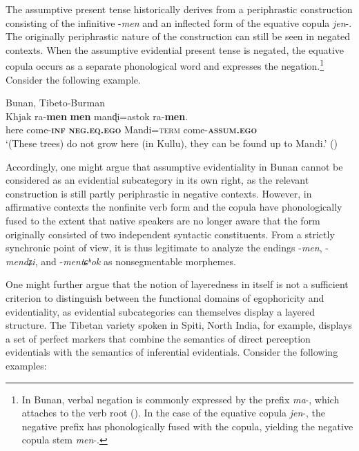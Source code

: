 \documentclass[output=paper]{langsci/langscibook}
\begin{document}
The assumptive present tense historically derives from a periphrastic construction consisting of the infinitive -\textit{men} and an inflected form of the equative copula \textit{jen}-. The originally periphrastic nature of the construction can still be seen in negated contexts. When the assumptive evidential present tense is negated, the equative copula occurs as a separate phonological word and expresses the negation.\footnote{In Bunan, verbal negation is commonly expressed by the prefix \textit{ma}-, which attaches to the verb root (\citealt[429--432]{Widmer2017a}). In the case of the equative copula \textit{jen}-, the negative prefix has phonologically fused with the copula, yielding the negative copula stem \textit{men}-.} Consider the following example.

\begin{exe}
	\ex Bunan, Tibeto-Burman\label{ex:mw5}\\
	\gll Khjak ra-\textbf{men} \textbf{men} manɖi=astok ra-\textbf{men}.\\
	here	 come-\textbf{\textsc{inf}} \textbf{\textsc{neg}.\textsc{eq}.\textsc{ego}} Mandi=\textsc{term} come-\textbf{\textsc{assum}.\textsc{ego}}\\
	\trans ‘(These trees) do not grow here (in Kullu), they can be found up to Mandi.’ (\citealt[223]{Widmer2017a})
\end{exe}


Accordingly, one might argue that assumptive evidentiality in Bunan cannot be considered as an evidential subcategory in its own right, as the relevant construction is still partly periphrastic in negative contexts. However, in affirmative contexts the nonfinite verb form and the copula have phonologically fused to the extent that native speakers are no longer aware that the form originally consisted of two independent syntactic constituents. From a strictly synchronic point of view, it is thus legitimate to analyze the endings -\textit{men}, -\textit{mendʑi}, and -\textit{mentɕʰok} as nonsegmentable morphemes.

One might further argue that the notion of layeredness in itself is not a sufficient criterion to distinguish between the functional domains of egophoricity and evidentiality, as evidential subcategories can themselves display a layered structure. The Tibetan variety spoken in Spiti, North India, for example, displays a set of perfect markers that combine the semantics of direct perception evidentials with the semantics of inferential evidentials. Consider the following examples:
\end{document}
